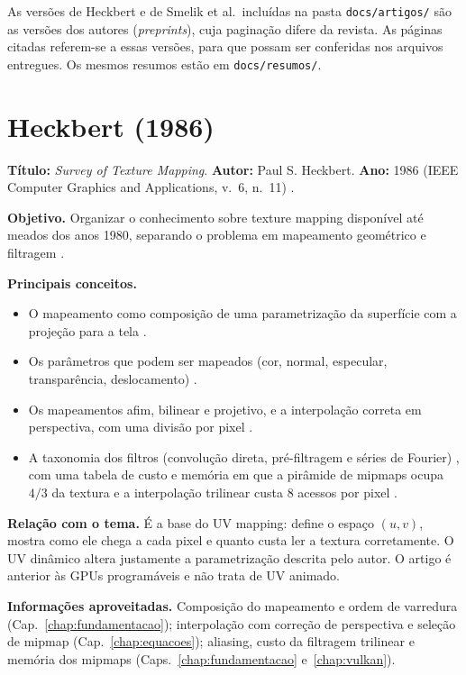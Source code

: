 
As versões de Heckbert e de Smelik et al.\ incluídas na pasta \texttt{docs/artigos/} são as versões dos autores (\textit{preprints}), cuja paginação difere da revista. As páginas citadas referem-se a essas versões, para que possam ser conferidas nos arquivos entregues. Os mesmos resumos estão em \texttt{docs/resumos/}.

\section{Heckbert (1986)}

\textbf{Título:} \textit{Survey of Texture Mapping}. \textbf{Autor:} Paul S. Heckbert. \textbf{Ano:} 1986 (IEEE Computer Graphics and Applications, v.~6, n.~11) \cite{heckbert1986}.

\textbf{Objetivo.} Organizar o conhecimento sobre texture mapping disponível até meados dos anos 1980, separando o problema em mapeamento geométrico e filtragem \cite[p.~1]{heckbert1986}.

\textbf{Principais conceitos.}
\begin{itemize}
    \item O mapeamento como composição de uma parametrização da superfície com a projeção para a tela \cite[p.~2]{heckbert1986}.
    \item Os parâmetros que podem ser mapeados (cor, normal, especular, transparência, deslocamento) \cite[p.~2]{heckbert1986}.
    \item Os mapeamentos afim, bilinear e projetivo, e a interpolação correta em perspectiva, com uma divisão por pixel \cite[pp.~4--5]{heckbert1986}.
    \item A taxonomia dos filtros (convolução direta, pré-filtragem e séries de Fourier) \cite[p.~7]{heckbert1986}, com uma tabela de custo e memória em que a pirâmide de mipmaps ocupa \(4/3\) da textura e a interpolação trilinear custa 8 acessos por pixel \cite[pp.~9--10]{heckbert1986}.
\end{itemize}

\textbf{Relação com o tema.} É a base do UV mapping: define o espaço \((u,v)\), mostra como ele chega a cada pixel e quanto custa ler a textura corretamente. O UV dinâmico altera justamente a parametrização descrita pelo autor. O artigo é anterior às GPUs programáveis e não trata de UV animado.

\textbf{Informações aproveitadas.} Composição do mapeamento e ordem de varredura (Cap.~\ref{chap:fundamentacao}); interpolação com correção de perspectiva e seleção de mipmap (Cap.~\ref{chap:equacoes}); aliasing, custo da filtragem trilinear e memória dos mipmaps (Caps.~\ref{chap:fundamentacao} e~\ref{chap:vulkan}).

